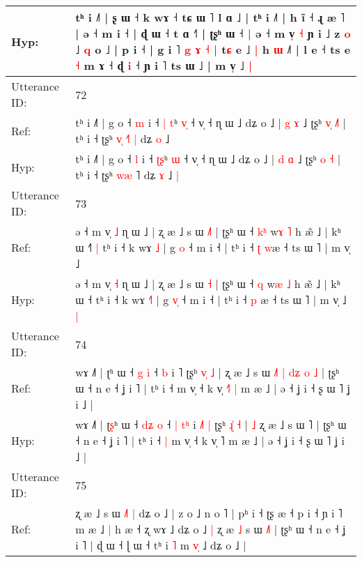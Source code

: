 \documentclass[10pt]{article}
\DeclareRobustCommand{\hl}[1]{{\textcolor{red}{#1}}}
\begin{document}
\begin{longtable}{ll}
 \\
Hyp: & tʰ i ˩˥ | ʂ ɯ ˧ k wɤ ˧ tɕ ɯ ˥ l ɑ ˩ | tʰ i ˩˥ | h ĩ ˧ ɻ æ ˥ | ə ˧ m i ˧ | ɖ ɯ ˧ t ɑ ˧˥ | ʈʂʰ ɯ ˧\hl{ }\hl{|} ə ˧ m v̩ \hl{˧} ɲ i ˩ z \hl{o} ˩ \hl{q} o ˩ | p i ˧ | g i \hl{}˥ \hl{g} \hl{ɤ} \hl{˧} \hl{|} t\hl{ɕ} e ˩\hl{ }\hl{|} h \hl{ɯ} ˩˥ | l e ˧ ts e\hl{}\hl{} \hl{˧} m ɤ ˧ ɖ \hl{i} ˧ ɲ i ˥ ts ɯ ˩ | m v̩ ˩\hl{ }\hl{|}
 \\
\midrule
Utterance ID: & 72 \\
Ref: & tʰ i ˩˥ | g o ˧ \hl{m} i ˧ \hl{|}\hl{ }\hl{t}ʰ \hl{v}\hl{̩} ˧ v̩ ˧ ɳ ɯ ˩ dʑ o ˩ | \hl{g} \hl{ɤ} ˩ ʈʂʰ \hl{v}\hl{̩} \hl{˩}\hl{˥} | tʰ i ˧ ʈʂʰ \hl{v}\hl{̩} \hl{˧}˥\hl{ }\hl{|} dʑ \hl{o} ˩\hl{}\hl{}
 \\
Hyp: & tʰ i ˩˥ | g o ˧ \hl{l} i ˧ \hl{}\hl{ʈ}\hl{ʂ}ʰ \hl{}\hl{ɯ} ˧ v̩ ˧ ɳ ɯ ˩ dʑ o ˩ | \hl{d} \hl{ɑ} ˩ ʈʂʰ \hl{}\hl{o} \hl{}\hl{˧} | tʰ i ˧ ʈʂʰ \hl{w}\hl{æ} \hl{}˥\hl{}\hl{} dʑ \hl{ɤ} ˩\hl{ }\hl{|}
 \\
\midrule
Utterance ID: & 73 \\
Ref: & ə ˧ m v̩ \hl{˩} ɳ ɯ ˩ | ʐ æ ˩ s ɯ \hl{˩}\hl{˥} | ʈʂʰ ɯ ˧ \hl{k}\hl{ʰ} w\hl{ɤ} \hl{˥} h æ̃ ˩ | kʰ ɯ ˧\hl{˥}\hl{ }\hl{|} tʰ i ˧ k wɤ \hl{}\hl{˩} | g \hl{}\hl{o} ˧ m i ˧ | tʰ i ˧ \hl{ʈ} \hl{w}æ ˧ ts ɯ ˥ | m v̩ ˩\hl{}\hl{}
 \\
Hyp: & ə ˧ m v̩ \hl{˧} ɳ ɯ ˩ | ʐ æ ˩ s ɯ \hl{}\hl{˧} | ʈʂʰ ɯ ˧ \hl{}\hl{q} w\hl{æ} \hl{˩} h æ̃ ˩ | kʰ ɯ ˧\hl{}\hl{}\hl{} tʰ i ˧ k wɤ \hl{˧}\hl{˥} | g \hl{v}\hl{̩} ˧ m i ˧ | tʰ i ˧ \hl{p} \hl{}æ ˧ ts ɯ ˥ | m v̩ ˩\hl{ }\hl{|}
 \\
\midrule
Utterance ID: & 74 \\
Ref: & wɤ ˩˥ | ʈ\hl{}ʰ ɯ ˧ \hl{}\hl{g} \hl{i} ˧\hl{}\hl{} \hl{}\hl{b} i \hl{}˥\hl{}\hl{} ʈʂʰ \hl{v}\hl{̩} \hl{˩} |\hl{}\hl{} ʐ æ ˩ s ɯ \hl{˩}˥\hl{ }\hl{|}\hl{ }\hl{d}\hl{ʑ}\hl{ }\hl{o}\hl{ }\hl{˩} | ʈʂʰ ɯ ˧ n e ˧ ʝ i ˥ | tʰ i ˧\hl{}\hl{} m v̩ ˧ k v̩ \hl{˧}˥\hl{ }\hl{|} m æ ˩ | ə ˧ ʝ i ˧ ʂ ɯ ˥ ʝ i ˩ |
 \\
Hyp: & wɤ ˩˥ | ʈ\hl{ʂ}ʰ ɯ ˧ \hl{d}\hl{ʑ} \hl{o} ˧\hl{ }\hl{|} \hl{t}\hl{ʰ} i \hl{˩}˥\hl{ }\hl{|} ʈʂʰ \hl{ɻ}\hl{̍} \hl{˧} |\hl{ }\hl{˩} ʐ æ ˩ s ɯ \hl{}˥\hl{}\hl{}\hl{}\hl{}\hl{}\hl{}\hl{}\hl{}\hl{} | ʈʂʰ ɯ ˧ n e ˧ ʝ i ˥ | tʰ i ˧\hl{ }\hl{|} m v̩ ˧ k v̩ \hl{}˥\hl{}\hl{} m æ ˩ | ə ˧ ʝ i ˧ ʂ ɯ ˥ ʝ i ˩ |
 \\
\midrule
Utterance ID: & 75 \\
Ref: & ʐ æ ˩ s ɯ\hl{ }\hl{˩}\hl{˥} \hl{|} dʑ o ˩ | z o ˩ n o ˥ | pʰ i ˧ ʈʂ æ ˧ p i ˧ ɲ i ˥ m æ ˩\hl{ }\hl{|} h æ\hl{} ˧ ʐ wɤ ˩ dʑ o ˩\hl{ }\hl{|} ʐ æ \hl{˩} s ɯ \hl{˩}˥ | ʈʂʰ ɯ ˧ n e ˧ ʝ i ˥ | ɖ ɯ ˧ ɭ ɯ ˧ tʰ i \hl{˥} m \hl{v}\hl{̩} ˩ dʑ o ˩ |

\end{longtable}
\end{document}
